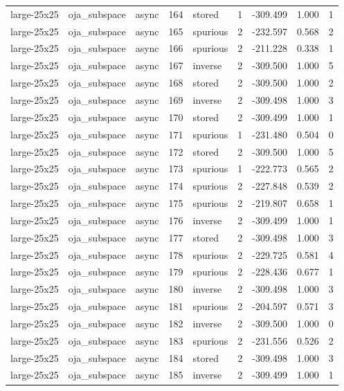 \begin{tabular}{lllrlrrrr}
large-25x25 & oja\_subspace & async & 164 & stored & 1 & -309.499 & 1.000 & 1 \\
large-25x25 & oja\_subspace & async & 165 & spurious & 2 & -232.597 & 0.568 & 2 \\
large-25x25 & oja\_subspace & async & 166 & spurious & 2 & -211.228 & 0.338 & 1 \\
large-25x25 & oja\_subspace & async & 167 & inverse & 2 & -309.500 & 1.000 & 5 \\
large-25x25 & oja\_subspace & async & 168 & stored & 2 & -309.500 & 1.000 & 2 \\
large-25x25 & oja\_subspace & async & 169 & inverse & 2 & -309.498 & 1.000 & 3 \\
large-25x25 & oja\_subspace & async & 170 & stored & 2 & -309.499 & 1.000 & 1 \\
large-25x25 & oja\_subspace & async & 171 & spurious & 1 & -231.480 & 0.504 & 0 \\
large-25x25 & oja\_subspace & async & 172 & stored & 2 & -309.500 & 1.000 & 5 \\
large-25x25 & oja\_subspace & async & 173 & spurious & 1 & -222.773 & 0.565 & 2 \\
large-25x25 & oja\_subspace & async & 174 & spurious & 2 & -227.848 & 0.539 & 2 \\
large-25x25 & oja\_subspace & async & 175 & spurious & 2 & -219.807 & 0.658 & 1 \\
large-25x25 & oja\_subspace & async & 176 & inverse & 2 & -309.499 & 1.000 & 1 \\
large-25x25 & oja\_subspace & async & 177 & stored & 2 & -309.498 & 1.000 & 3 \\
large-25x25 & oja\_subspace & async & 178 & spurious & 2 & -229.725 & 0.581 & 4 \\
large-25x25 & oja\_subspace & async & 179 & spurious & 2 & -228.436 & 0.677 & 1 \\
large-25x25 & oja\_subspace & async & 180 & inverse & 2 & -309.498 & 1.000 & 3 \\
large-25x25 & oja\_subspace & async & 181 & spurious & 2 & -204.597 & 0.571 & 3 \\
large-25x25 & oja\_subspace & async & 182 & inverse & 2 & -309.500 & 1.000 & 0 \\
large-25x25 & oja\_subspace & async & 183 & spurious & 2 & -231.556 & 0.526 & 2 \\
large-25x25 & oja\_subspace & async & 184 & stored & 2 & -309.498 & 1.000 & 3 \\
large-25x25 & oja\_subspace & async & 185 & inverse & 2 & -309.499 & 1.000 & 1 \\

\end{tabular}

